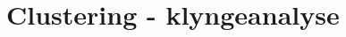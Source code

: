 \documentclass[a4paper, 12pt]{article}
\theoremstyle{remark}
\newtheorem{Opgave}{\textbf{Opgave}}
\begin{document}
%
%
%
%
\section*{Clustering - klyngeanalyse}
\end{document}

